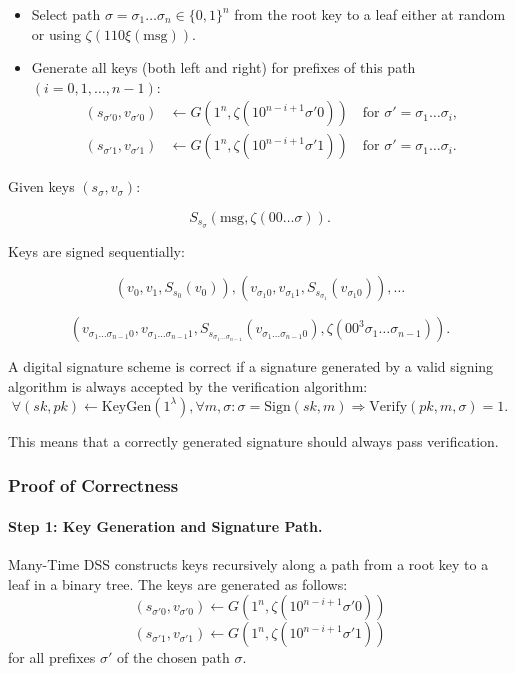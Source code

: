 \begin{itemize}
    \item Select path $\sigma = \sigma_1 \dots \sigma_n \in \{0,1\}^n$ from the root key to a leaf either at random or using $\zeta(110\xi(\text{msg}))$.
    \item Generate all keys (both left and right) for prefixes of this path $(i = 0,1,\dots,n-1)$:
    \begin{align*}
        (s_{\sigma'0}, v_{\sigma'0}) &\leftarrow G(1^n, \zeta(10^{n-i+1}\sigma'0)) \quad \text{for } \sigma' = \sigma_1\dots\sigma_i,\\
        (s_{\sigma'1}, v_{\sigma'1}) &\leftarrow G(1^n, \zeta(10^{n-i+1}\sigma'1)) \quad \text{for } \sigma' = \sigma_1\dots\sigma_i.
    \end{align*}
\end{itemize}

Given keys $(s_{\sigma}, v_{\sigma})$:

\[
S_{s_{\sigma}}(\text{msg}, \zeta(00\dots\sigma)).
\]

Keys are signed sequentially:

\[
(v_0, v_1, S_{s_0}(v_0)), (v_{\sigma_1 0}, v_{\sigma_1 1}, S_{s_{\sigma_1}}(v_{\sigma_1 0})), \dots
\]

\[
(v_{\sigma_1\dots\sigma_{n-1} 0}, v_{\sigma_1\dots\sigma_{n-1} 1}, S_{s_{\sigma_1\dots\sigma_{n-1}}}(v_{\sigma_1\dots\sigma_{n-1} 0}), \zeta(00^3 \sigma_1\dots\sigma_{n-1})).
\]


A digital signature scheme is correct if a signature generated by a valid signing algorithm is always accepted by the verification algorithm:
\begin{equation}
    \forall (sk, pk) \leftarrow \text{KeyGen}(1^\lambda), \forall m, \sigma: \sigma = \text{Sign}(sk, m) \Rightarrow \text{Verify}(pk, m, \sigma) = 1.
\end{equation}

This means that a correctly generated signature should always pass verification.

\subsubsection{Proof of Correctness}

\paragraph{Step 1: Key Generation and Signature Path.}
Many-Time DSS constructs keys recursively along a path from a root key to a leaf in a binary tree. The keys are generated as follows:
\begin{equation}
    (s_{\sigma'0}, v_{\sigma'0}) \gets G(1^n, \zeta(10^{n-i+1} \sigma'0))
\end{equation}
\begin{equation}
    (s_{\sigma'1}, v_{\sigma'1}) \gets G(1^n, \zeta(10^{n-i+1} \sigma'1))
\end{equation}
for all prefixes \( \sigma' \) of the chosen path \( \sigma \).

